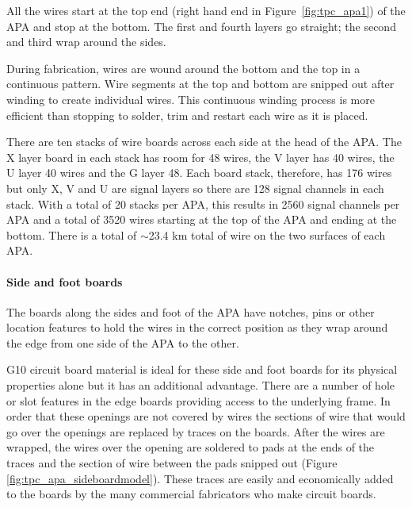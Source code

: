 All the wires start at the top end (right hand end in Figure~\ref{fig:tpc_apa1})  of the APA and stop at the bottom. The first and fourth layers go straight; the second and third wrap around the sides. 

During fabrication, wires are wound around the bottom and the top %
in a continuous pattern. Wire segments at the top and bottom are snipped out after winding to create individual wires.  This continuous winding process is more efficient than stopping to solder, trim and restart each wire as it is placed.

There are ten stacks of wire boards across each side at the head of the APA.  
The X layer board in each stack has room for 48 wires, the V layer has 40 wires, the U layer 40 wires and the G layer 48.  
Each board stack, therefore, has 176 wires but only X, V and U are signal layers so there are 128 signal channels in each stack.  With a total of 20 stacks per APA, this results in 2560 signal channels per APA and a total of 3520 wires starting at the top of the APA and ending at the bottom.  There is a total of $\sim$23.4 km total of wire on the two surfaces of each APA.  

\paragraph{Side and foot boards}

The boards along the sides and foot of the APA have notches, pins or other location features to hold the wires in the correct position as they wrap around the edge from one side of the APA to the other.

G10 circuit board material is ideal for these side and foot boards for its physical properties alone but it has an additional advantage.  There are a number of hole or slot features in the edge boards providing access to the underlying frame.  In order that these openings are not covered by wires the sections of wire that would go over the openings are replaced by traces on the boards.  After the wires are wrapped, the wires over the opening are soldered to pads at the ends of the traces and the section of wire between the pads snipped out (Figure \ref{fig:tpc_apa_sideboardmodel}).  These traces are easily and economically added to the boards by the many commercial fabricators who make circuit boards. 

